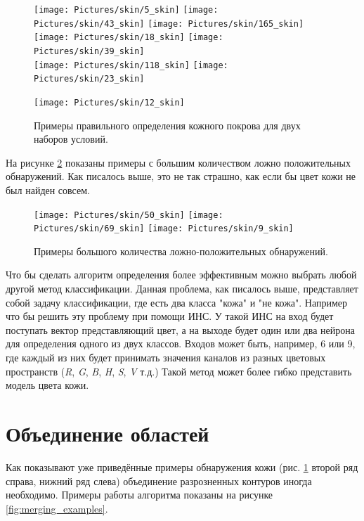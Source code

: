 \documentclass[12pt]{report}
\begin{document}
\begin{figure}[p]
	\centering	
	\texttt{[image: Pictures/skin/5\_skin]}\hspace{0.2cm}
	\texttt{[image: Pictures/skin/43\_skin]}\hspace{0.2cm}
	\texttt{[image: Pictures/skin/165\_skin]}
	\\[0.5cm]
	\texttt{[image: Pictures/skin/18\_skin]}\hspace{0.2cm}
	\texttt{[image: Pictures/skin/39\_skin]}
	\\[0.5cm]
	\texttt{[image: Pictures/skin/118\_skin]}\hspace{0.2cm}
	\texttt{[image: Pictures/skin/23\_skin]}
	
	\texttt{[image: Pictures/skin/12\_skin]}
	\caption{Примеры правильного определения кожного покрова для двух наборов условий.}	
	\label{fig:skin_contour_samples}
\end{figure}

На рисунке \ref{fig:many_false_possitives} показаны примеры с большим количеством ложно положительных обнаружений. 
Как писалось выше, это не так страшно, как если бы цвет кожи не был найден совсем.
\begin{figure}[h]
	\centering	
	\texttt{[image: Pictures/skin/50\_skin]}\hspace{0.2cm}
	\texttt{[image: Pictures/skin/69\_skin]}\hspace{0.2cm}
	\texttt{[image: Pictures/skin/9\_skin]}\hspace{0.2cm}
		
	\caption{Примеры большого количества ложно-положительных обнаружений.}	
	\label{fig:many_false_possitives}
\end{figure}

Что бы сделать алгоритм определения более эффективным можно выбрать любой другой метод классификации. Данная 
проблема, как писалось выше, представляет собой задачу классификации, где есть два класса "кожа" и "не кожа". 
Например что бы решить эту проблему при помощи ИНС. У такой ИНС на вход будет поступать вектор представляющий цвет, а 
на выходе будет один или два нейрона для определения одного из двух классов. Входов может быть, например, 6 или 9, 
где каждый из них будет принимать значения каналов из разных цветовых пространств (\textit{R}, \textit{G}, \textit
{B}, \textit{H}, \textit{S}, \textit{V} т.д.) Такой метод может более гибко представить модель цвета кожи.

\section{Объединение областей}
Как показывают уже приведённые примеры обнаружения кожи (рис. \ref{fig:skin_contour_samples} второй ряд справа, 
нижний ряд слева) объединение разрозненных контуров иногда необходимо. Примеры работы алгоритма показаны на рисунке 
\ref{fig:merging_examples}.
\end{document}
